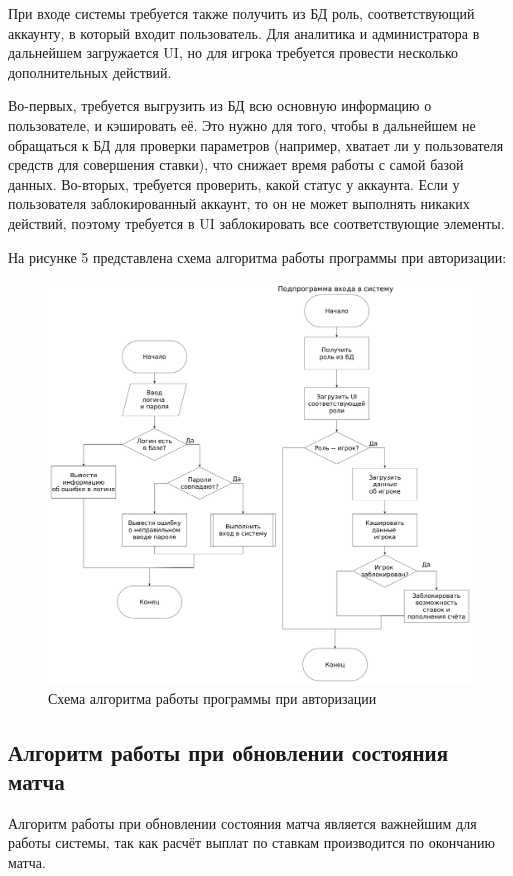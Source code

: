 При входе системы требуется также получить из БД роль, соответствующий аккаунту, в который входит пользователь.
Для аналитика и администратора в дальнейшем загружается UI, но для игрока требуется провести несколько дополнительных действий.

Во-первых, требуется выгрузить из БД всю основную информацию о пользователе, и кэшировать её.
Это нужно для того, чтобы в дальнейшем не обращаться к БД для проверки параметров (например, хватает ли у пользователя средств для совершения ставки), что снижает время работы с самой базой данных.
Во-вторых, требуется проверить, какой статус у аккаунта. 
Если у пользователя заблокированный аккаунт, то он не может выполнять никаких действий, поэтому требуется в UI заблокировать все соответствующие элементы.

\newpage
На рисунке 5 представлена схема алгоритма работы программы при авторизации:
\FloatBarrier
\begin{figure}[h]	
	\begin{center}
		\includegraphics[width=\linewidth]{inc/auth.png}
	\end{center}
	\captionsetup{justification=centering, labelsep=defffis}
	\caption{Схема алгоритма работы программы при авторизации}
	\label{fig::auth}
\end{figure}
\FloatBarrier

\newpage
\subsection{Алгоритм работы при обновлении состояния матча}
Алгоритм работы при обновлении состояния матча является важнейшим для работы системы, так как расчёт выплат по ставкам производится по окончанию матча.

